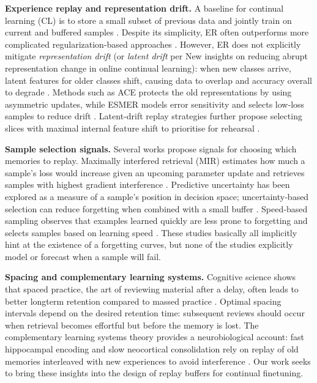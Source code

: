 \documentclass{article}
\begin{document}
\textbf{Experience replay and representation drift.}  
A baseline for continual learning (CL) is to store a small subset of previous data and jointly train on current and buffered samples \citep{chaudhry2019tiny}.  Despite its simplicity, ER often outperforms more complicated regularization\mbox{‑}based approaches \citep{delange2021survey}.  However, ER does not explicitly mitigate \emph{representation drift} (or \emph{latent drift} per New
insights on reducing abrupt representation change in online continual learning): when new classes arrive, latent features for older classes shift, causing data to overlap and accuracy overall to degrade \citep{caccia2022ace}.  Methods such as ACE protects the old representations by using asymmetric updates, while ESMER models error sensitivity and selects low\mbox{‑}loss samples to reduce drift \citep{sarfraz2023esmer}.  Latent\mbox{‑}drift replay strategies further propose selecting slices with maximal internal feature shift to prioritise for rehearsal \citep{theofilou2025stabledrift}.

\textbf{Sample selection signals.}  
Several works propose signals for choosing which memories to replay.  Maximally interfered retrieval (MIR) estimates how much a sample's loss would increase given an upcoming parameter update and retrieves samples with highest gradient interference \citep{aljundi2019mir}.  Predictive uncertainty has been explored as a measure of a sample's position in decision space; uncertainty\mbox{‑}based selection can reduce forgetting when combined with a small buffer \citep{serra2025uncertainty}.  Speed\mbox{‑}based sampling observes that examples learned quickly are less prone to forgetting and selects samples based on learning speed \citep{hacochen2025sbs}.  These studies basically all implicitly hint at the existence of a forgetting curves, but none of the studies explicitly model or forecast when a sample will fail.

\textbf{Spacing and complementary learning systems.}  Cognitive science shows that spaced practice, the art of reviewing material after a delay, often leads to better longterm retention compared to massed practice \citep{cepeda2008spacing}.  Optimal spacing intervals depend on the desired retention time: subsequent reviews should occur when retrieval becomes effortful but before the memory is lost.  The complementary learning systems theory provides a neurobiological account: fast hippocampal encoding and slow neocortical consolidation rely on replay of old memories interleaved with new experiences to avoid interference \citep{mcclelland1995cls}.  Our work seeks to bring these insights into the design of replay buffers for continual finetuning.
\end{document}
